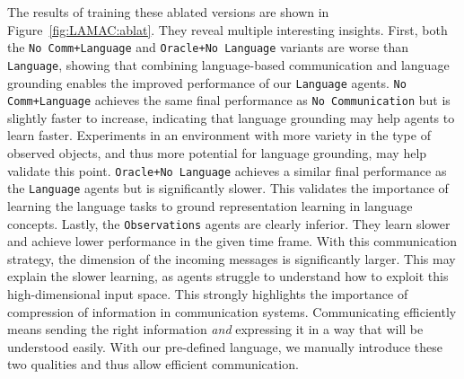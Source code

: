 The results of training these ablated versions are shown in Figure~\ref{fig:LAMAC:ablat}. They reveal multiple interesting insights. First, both the \texttt{No Comm+Language} and \texttt{Oracle+No Language} variants are worse than \texttt{Language}, showing that combining language-based communication and language grounding enables the improved performance of our \texttt{Language} agents. \texttt{No Comm+Language} achieves the same final performance as \texttt{No Communication} but is slightly faster to increase, indicating that language grounding may help agents to learn faster. Experiments in an environment with more variety in the type of observed objects, and thus more potential for language grounding, may help validate this point. \texttt{Oracle+No Language} achieves a similar final performance as the \texttt{Language} agents but is significantly slower. This validates the importance of learning the language tasks to ground representation learning in language concepts. Lastly, the \texttt{Observations} agents are clearly inferior. They learn slower and achieve lower performance in the given time frame. With this communication strategy, the dimension of the incoming messages is significantly larger. This may explain the slower learning, as agents struggle to understand how to exploit this high-dimensional input space. This strongly highlights the importance of compression of information in communication systems. Communicating efficiently means sending the right information \textit{and} expressing it in a way that will be understood easily. With our pre-defined language, we manually introduce these two qualities and thus allow efficient communication. 

